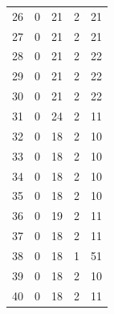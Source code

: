 \documentclass[12pt,a4paper]{report}
\begin{document}
\begin{appendices}
\begin{longtable}{lcccc}
26  &   0 &  21 &   2 &  21 \\
27  &   0 &  21 &   2 &  21 \\
28  &   0 &  21 &   2 &  22 \\
29  &   0 &  21 &   2 &  22 \\
30  &   0 &  21 &   2 &  22 \\
31  &   0 &  24 &   2 &  11 \\
32  &   0 &  18 &   2 &  10 \\
33  &   0 &  18 &   2 &  10 \\
34  &   0 &  18 &   2 &  10 \\
35  &   0 &  18 &   2 &  10 \\
36  &   0 &  19 &   2 &  11 \\
37  &   0 &  18 &   2 &  11 \\
38  &   0 &  18 &   1 &  51 \\
39  &   0 &  18 &   2 &  10 \\
40  &   0 &  18 &   2 &  11 \\
\bottomrule
\end{longtable}


\end{appendices}
\end{document}
